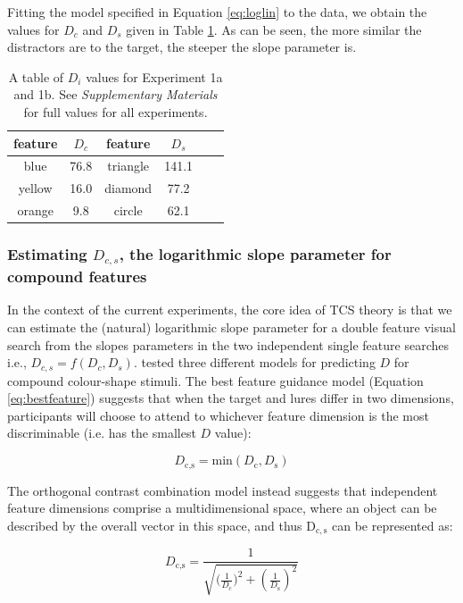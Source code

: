 \documentclass[preprint,12pt,authoryear]{elsarticle}
\begin{document}
Fitting the model specified in Equation \ref{eq:loglin} to the data, we obtain the values for $D_c$ and $D_s$ given in Table \ref{tab:reimp_Dc_Ds}. As can be seen, the more similar the distractors are to the target, the steeper the slope parameter is. 

\begin{table}[h]
\centering
\begin{tabular}{ c|c||c|ccc } 
feature & $D_c$ & feature & $D_s$\\
 \hline 
blue & 76.8 & triangle & 141.1\\
yellow & 16.0 & diamond & 77.2\\
orange & 9.8  & circle & 62.1\\
\end{tabular}
\caption{A table of $D_i$ values for Experiment 1a and 1b. See \textit{Supplementary Materials} for full values for all experiments.}
\label{tab:reimp_Dc_Ds}
\end{table}

\subsubsection{Estimating $D_{c,s}$, the logarithmic slope parameter for compound features}

In the context of the current experiments, the core idea of TCS theory is that we can estimate the (natural) logarithmic slope parameter for a double feature visual search from the slopes parameters in the two independent single feature searches i.e., $D_{c,s} = f(D_c, D_s)$. \cite{buetti2019predicting} tested three different models for predicting $D$ for compound colour-shape stimuli. The best feature guidance model (Equation \ref{eq:bestfeature}) suggests that when the target and lures differ in two dimensions, participants will choose to attend to whichever feature dimension is the most discriminable (i.e. has the smallest $D$ value):

\begin{equation}
D_\text{c,s} = \text{min}\left(D_\text{c}, D_\text{s}\right)
\label{eq:bestfeature}
\end{equation}

The orthogonal contrast combination model instead suggests that independent feature dimensions comprise a multidimensional space, where an object can be described by the overall vector in this space, and thus $\mathrm{D_{c,s}}$ can be represented as:

\begin{equation}
D_\text{c,s} = \frac{1}{\sqrt{{(\frac{1}{D_\text{c}}})^2 + (\frac{1}{D_\text{s}})^2}}
\label{eq:orthogonalcontrast}
\end{equation}
\end{document}
